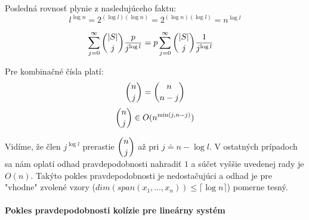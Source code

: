 Posledná rovnosť plynie z nasledujúceho faktu:
\begin{displaymath}
l^{\log n} = 2^{(\log l)(\log n)} = 2^{(\log n)(\log l)} = n^{\log l}
\end{displaymath}

\begin{displaymath}
\begin{split}
\displaystyle \sum_{j=0}^{\infty} \dbinom{|S|}{j}\frac{p}{j^{\log l}} 
	& = p \displaystyle \sum_{j=0}^{\infty} \dbinom{|S|}{j}\frac{1}{j^{\log l}}
\end{split}
\end{displaymath}

Pre kombinačné čísla platí:
\begin{displaymath}
\dbinom{n}{j} = \dbinom{n}{n-j}
\end{displaymath}
\begin{displaymath}
\dbinom{n}{j} \in O(n^{\min(j, n-j)})
\end{displaymath}

Vidíme, že člen $j^{\log l}$ prerastie $\dbinom{n}{j}$ až pri $j \doteq n - \log l$. V ostatných prípadoch sa nám oplatí odhad pravdepodobnosti nahradiť $1$ a súčet vyššie uvedenej rady je $O(n)$. Takýto pokles pravdepodobnosti je nedostačujúci a odhad je pre "vhodne" zvolené vzory ($dim(span(x_1, \dots, x_n)) \leq \lceil \log n \rceil$) pomerne tesný.

\paragraph{Pokles pravdepodobnosti kolízie pre lineárny systém}